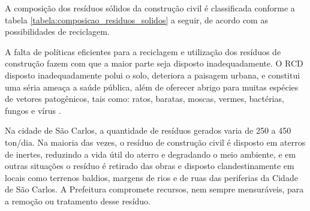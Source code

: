 A composição dos resíduos sólidos da construção civil é classificada conforme a tabela  \ref{tabela:composicao_residuos_solidos} a seguir, de acordo com as possibilidades de reciclagem.

\begin{table}[htb]
\end{table}

A falta de políticas eficientes para a reciclagem e utilização dos resíduos de construção fazem com que a maior parte seja disposto inadequadamente. O RCD disposto inadequadamente polui o solo, deteriora a paisagem urbana, e constitui uma séria ameaça a saúde pública, além de oferecer abrigo para muitas espécies de vetores patogênicos, tais como: ratos, baratas, moscas, vermes, bactérias, fungos e vírus \cite{schneider:master}.

Na cidade de São Carlos, a quantidade de resíduos gerados varia de 250 a 450 ton/dia. Na maioria das vezes, o resíduo de construção civil é disposto em aterros de inertes, reduzindo a vida útil do aterro e degradando o meio ambiente, e em outras situações o resíduo é retirado das obras e disposto clandestinamente em locais como terrenos baldios, margens de rios e de ruas das periferias da Cidade de São Carlos. A Prefeitura compromete recursos, nem sempre mensuráveis, para a remoção ou tratamento desse resíduo.

